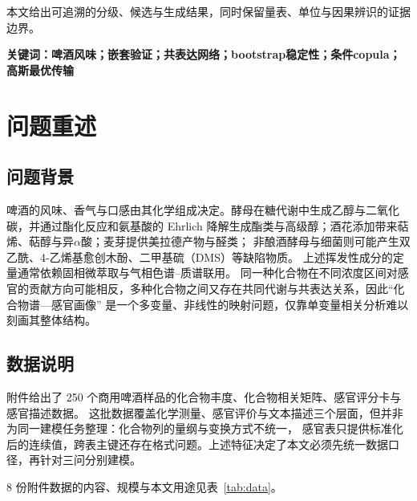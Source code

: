 \documentclass[UTF8,a4paper,zihao=-4]{ctexart}
\numberwithin{figure}{section}
\numberwithin{table}{section}
\numberwithin{equation}{section}
\begin{document}
本文给出可追溯的分级、候选与生成结果，同时保留量表、单位与因果辨识的证据边界。

\vspace{0.3em}
\noindent\textbf{关键词：啤酒风味；嵌套验证；共表达网络；bootstrap稳定性；条件copula；高斯最优传输}
\newpage
\pagestyle{empty}
\tableofcontents  


\newpage
\pagestyle{fancy}
\fancyhead{} %
\renewcommand{\headrulewidth}{0pt} %
\setcounter{page}{1}

\section{问题重述}
\label{sec:problem}

\subsection{问题背景}

啤酒的风味、香气与口感由其化学组成决定\cite{liu2023}。酵母在糖代谢中生成乙醇与二氧化碳，并通过酯化反应和氨基酸的 
Ehrlich 降解生成酯类与高级醇；酒花添加带来萜烯、萜醇与异$\alpha$酸；麦芽提供美拉德产物与醛类；
非酿酒酵母与细菌则可能产生双乙酰、4-乙烯基愈创木酚、二甲基硫（DMS）等缺陷物质\cite{guguoxian}。
上述挥发性成分的定量通常依赖固相微萃取与气相色谱--质谱联用\cite{lijj2025}。
同一种化合物在不同浓度区间对感官的贡献方向可能相反，多种化合物之间又存在共同代谢与共表达关系，因此“化合物谱—感官画像”
是一个多变量、非线性的映射问题，仅靠单变量相关分析难以刻画其整体结构。


\subsection{数据说明}
附件给出了 250 个商用啤酒样品\cite{schreurs2024}的化合物丰度、化合物相关矩阵、感官评分卡与感官描述数据。
这批数据覆盖化学测量、感官评价与文本描述三个层面，但并非为同一建模任务整理：化合物列的量纲与变换方式不统一，
感官表只提供标准化后的连续值，跨表主键还存在格式问题。上述特征决定了本文必须先统一数据口径，再针对三问分别建模。

8 份附件数据的内容、规模与本文用途见表~\ref{tab:data}。
\end{document}
